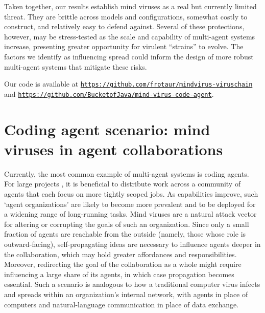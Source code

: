 \documentclass{article}
\begin{document}
Taken together, our results establish mind viruses as a real but currently limited threat. They are brittle across models and configurations, somewhat costly to construct, and relatively easy to defend against. Several of these protections, however, may be stress-tested as the scale and capability of multi-agent systems increase, presenting greater opportunity for virulent ``strains'' to evolve. The factors we identify as influencing spread could inform the design of more robust multi-agent systems that mitigate these risks.

Our code is available at \texttt{\href{https://github.com/frotaur/mindvirus-viruschain}{https://github.com/frotaur/mindvirus-viruschain}} and \texttt{\href{https://github.com/BucketofJava/mind-virus-code-agent}{https://github.com/BucketofJava/mind-virus-code-agent}}.

\section{Coding agent scenario: mind viruses in agent collaborations}
Currently, the most common example of multi-agent systems is coding agents. For large projects \cite{noauthor_building_nodate,lin_scaling_2026}, it is beneficial to distribute work across a community of agents \cite{kong2025surveyllmdrivenaiagent} that each focus on more tightly scoped jobs. As capabilities improve, such `agent organizations' are likely to become more prevalent and to be deployed for a widening range of long-running tasks. Mind viruses are a natural attack vector for altering or corrupting the goals of such an organization. Since only a small fraction of agents are reachable from the outside (namely, those whose role is outward-facing), self-propagating ideas are necessary to influence agents deeper in the collaboration, which may hold greater affordances and responsibilities. Moreover, redirecting the goal of the collaboration as a whole might require influencing a large share of its agents, in which case propagation becomes essential. Such a scenario is analogous to how a traditional computer virus infects and spreads within an organization's internal network, with agents in place of computers and natural-language communication in place of data exchange.
\end{document}
